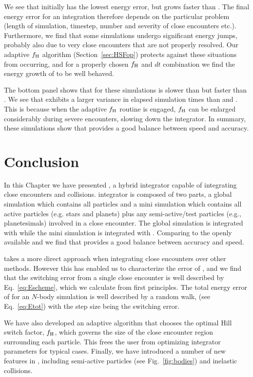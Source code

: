 We see that \hermes initially has the lowest energy error, but grows faster than \mercury.  
The final energy error for an integration therefore depends on the particular problem (length of simulation, timestep, number and severity of close encounters etc.).
Furthermore, we find that some \mercury simulations undergo significant energy jumps, probably also due to very close encounters that are not properly resolved. 
Our adaptive $f_{\rm H}$ algorithm (Section~\ref{sec:HSFop}) protects against these situations from occurring, and for a properly chosen $f_{\rm H}$ and $dt$ combination we find the energy growth of \hermes to be well behaved. 

The bottom panel shows that for these simulations \hermes is slower than \symba but faster than \mercury. 
We see that \hermes exhibits a larger variance in elapsed simulation times than \mercury and \symba. 
This is because when the adaptive $f_{\rm H}$ routine is engaged, $f_{\rm H}$ can be enlarged considerably during severe encounters, slowing down the integrator. 
In summary, these simulations show that \hermes provides a good balance between speed and accuracy.

\section{Conclusion}
\label{sec:Conclusion}
In this Chapter we have presented \hermes, a hybrid integrator capable of integrating close encounters and collisions. 
\hermes integrator is composed of two parts, a global simulation which contains all particles and a mini simulation which contains all active particles (e.g. stars and planets) plus any semi-active/test particles (e.g., planetesimals) involved in a close encounter.
The global simulation is integrated with \whfast while the mini simulation is integrated with \ias.
Comparing \hermes to the openly available \mercury and \symba we find that \hermes provides a good balance between accuracy and speed.

\hermes takes a more direct approach when integrating close encounters over other methods.
However this has enabled us to characterize the error of \hermes, and we find that the switching error from a single close encounter is well described by Eq.~\ref{eq:Escheme}, which we calculate from first principles.
The total energy error of \hermes for an $N$-body simulation is well described by a random walk, (see Eq.~\ref{eq:Etot}) with the step size being the switching error.

We have also developed an adaptive algorithm that chooses the optimal Hill switch factor, $f_{\rm H}$, which governs the size of the close encounter region surrounding each particle.
This frees the user from optimizing integrator parameters for typical cases. 
Finally, we have introduced a number of new features in \reb, including semi-active particles (see Fig.~\ref{fig:bodies}) and inelastic collisions.

